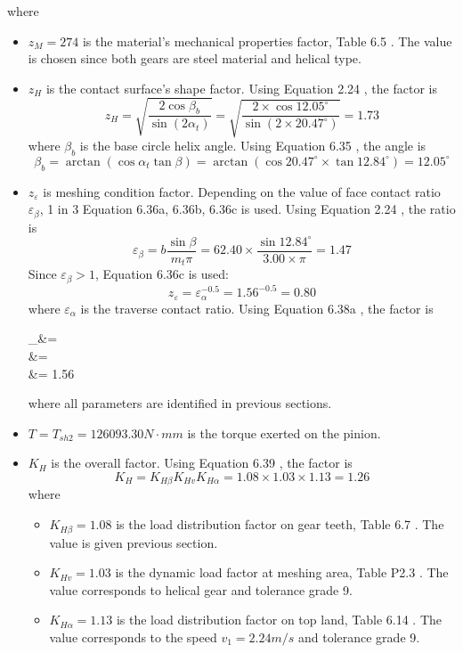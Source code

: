 where
\begin{itemize}
	\item $ z_M = 274 $ is the material's mechanical properties factor, Table 6.5 \cite{tk1}. The value is chosen since both gears are steel material and helical type.
	\item $ z_H $ is the contact surface's shape factor. Using Equation 2.24 \cite{tk1}, the factor is
	\[ z_H = \sqrt{\dfrac{2\cos\beta_b}{\sin(2\alpha_t)}} = \sqrt{\dfrac{2\times\cos 12.05^\circ}{\sin(2\times 20.47^\circ)}} = 1.73\]
	where $ \beta_b $ is the base circle helix angle. Using Equation 6.35 \cite{tk1}, the angle is
	\[ \beta_b = \arctan\left( \cos\alpha_t\tan\beta\right) = \arctan\left( \cos 20.47^\circ \times \tan 12.84^\circ\right) = 12.05^\circ\]
	\item $ z_\varepsilon $ is meshing condition factor. Depending on the value of face contact ratio $ \varepsilon_\beta $, 1 in 3 Equation 6.36a, 6.36b, 6.36c \cite{tk1} is used. Using Equation 2.24 \cite{tk1}, the ratio is
	\[\varepsilon_\beta = b\dfrac{\sin\beta}{m_t\pi} = 62.40\times\dfrac{\sin 12.84^\circ}{3.00\times\pi}=1.47\]
	Since $ \varepsilon_\beta >1 $, Equation 6.36c \cite{tk1} is used:
	\[z_\varepsilon = \varepsilon_\alpha^{-0.5} = 1.56^{-0.5} = 0.80\]	
	where $ \varepsilon_\alpha $ is the traverse contact ratio. Using Equation 6.38a \cite{tk1}, the factor is
	\begin{flalign*}
	\varepsilon_\alpha &= \\
	&= \\
	&= 1.56
	\end{flalign*}
	where all parameters are identified in previous sections.
	\item $ T=T_{sh2}=126093.30\unit{N\cdot mm} $ is the torque exerted on the pinion.
	\item $ K_H $ is the overall factor. Using Equation 6.39 \cite{tk1}, the factor is
	\[ K_H = K_{H\beta}K_{Hv}K_{H\alpha} = 1.08\times 1.03 \times 1.13  = 1.26\]
	where
	\begin{itemize}
		\item $ K_{H\beta} = 1.08 $ is the load distribution factor on gear teeth, Table 6.7 \cite{tk1}. The value is given previous section.
		\item $ K_{Hv} = 1.03 $ is the dynamic load factor at meshing area, Table P2.3 \cite{tk1}. The value corresponds to helical gear and tolerance grade 9.
		\item $ K_{H\alpha} = 1.13 $ is the load distribution factor on top land, Table 6.14 \cite{tk1}. The value corresponds to the speed $ v_1=2.24\unit{m/s} $ and tolerance grade 9.
	\end{itemize}
\end{itemize}

